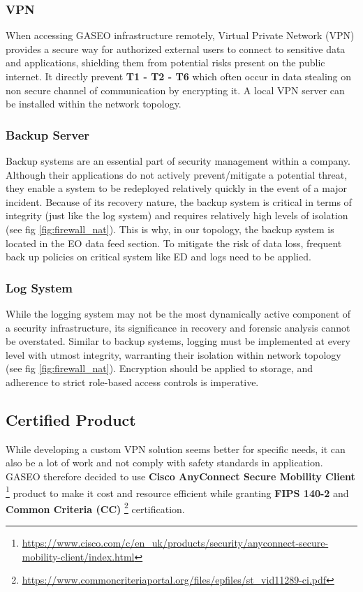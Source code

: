 \documentclass[12pt]{article}
\begin{document}
\subsubsection*{VPN}
When accessing GASEO infrastructure remotely, Virtual Private Network (VPN) provides a secure way for authorized external users to connect to sensitive data and applications, shielding them from potential risks present on the public internet.
It directly prevent \textbf{T1 - T2 - T6} which often occur in data stealing on non secure channel of communication by encrypting it. A local VPN server can be installed within the network topology. 

\subsubsection*{Backup Server}
Backup systems are an essential part of security management within a company. Although their applications do not actively prevent/mitigate a potential threat, they enable a system to be redeployed relatively quickly in the event of a major incident. 
Because of its recovery nature, the backup system is critical in terms of integrity (just like the log system) and requires relatively high levels of isolation (see fig \ref{fig:firewall_nat}). This is why, in our topology, the backup system is located in the EO data feed section.
To mitigate the risk of data loss, frequent back up policies on critical system like ED and logs need to be applied.
\subsubsection*{Log System}
While the logging system may not be the most dynamically active component of a security infrastructure, its significance in recovery and forensic analysis cannot be overstated. Similar to backup systems, logging must be implemented at every level with utmost integrity, warranting their isolation within network topology (see fig \ref{fig:firewall_nat}). Encryption should be applied to storage, and adherence to strict role-based access controls is imperative.

\newpage
\subsection{Certified Product}
While developing a custom VPN solution seems better for specific needs, it can also be a lot of work and not comply with safety standards in application. GASEO therefore decided to use \textbf{Cisco AnyConnect Secure Mobility Client} \footnote{\url{https://www.cisco.com/c/en_uk/products/security/anyconnect-secure-mobility-client/index.html}} product to make it cost and resource efficient while granting \textbf{FIPS 140-2} and \textbf{Common Criteria (CC)} \footnote{\url{https://www.commoncriteriaportal.org/files/epfiles/st_vid11289-ci.pdf}} certification.
\end{document}
